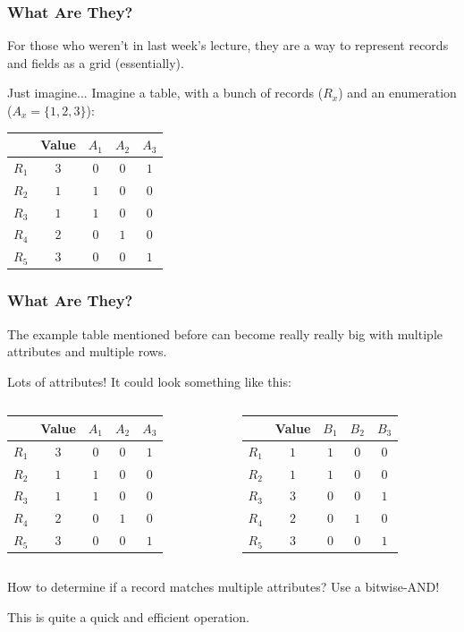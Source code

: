 \documentclass[11pt]{beamer}
\begin{document}
\begin{frame}
	\frametitle{What Are They?}
	
	For those who weren't in last week's lecture, they are a way to represent records and fields as a grid (essentially).
	
	\begin{exampleblock}{Just imagine...}
		Imagine a table, with a bunch of records ($R_x$) and an enumeration ($A_x = \{1, 2, 3\}$):
		
		\begin{tabular}{r|c|c|c|c}
				& \textbf{Value} & $A_1$ & $A_2$ & $A_3$ \\ \hline
			$R_1$ & $3$	& $0$	& $0$	& $1$ \\
			$R_2$ & $1$	& $1$	& $0$	& $0$ \\
			$R_3$ & $1$	& $1$	& $0$	& $0$ \\
			$R_4$ & $2$	& $0$	& $1$	& $0$ \\
			$R_5$ & $3$	& $0$	& $0$	& $1$ 
		\end{tabular}
	\end{exampleblock}
\end{frame}

\begin{frame}
	\frametitle{What Are They?}
	
	The example table mentioned before can become really really big with multiple attributes and multiple rows.
	\pause
	\begin{exampleblock}{Lots of attributes!}
		It could look something like this:
		
		\begin{columns}[c]
			\begin{tabular}{r|c|c|c|c}
					& \textbf{Value} & $A_1$ & $A_2$ & $A_3$ \\ \hline
				$R_1$ & $3$	& $0$	& $0$	& $1$ \\
				$R_2$ & $1$	& $1$	& $0$	& $0$ \\
				$R_3$ & $1$	& $1$	& $0$	& $0$ \\
				$R_4$ & $2$	& $0$	& $1$	& $0$ \\
				$R_5$ & $3$	& $0$	& $0$	& $1$ 
			\end{tabular}
			\begin{tabular}{r|c|c|c|c}
					& \textbf{Value} & $B_1$ & $B_2$ & $B_3$ \\ \hline
				$R_1$ & $1$	& $1$	& $0$	& $0$ \\
				$R_2$ & $1$	& $1$	& $0$	& $0$ \\
				$R_3$ & $3$	& $0$	& $0$	& $1$ \\
				$R_4$ & $2$	& $0$	& $1$	& $0$ \\
				$R_5$ & $3$	& $0$	& $0$	& $1$ 
			\end{tabular}
		\end{columns}	
	\end{exampleblock}
	
	\pause
	How to determine if a record matches multiple attributes? Use a bitwise-AND!
	
	\pause
	This is quite a quick and efficient operation.
\end{frame}
\end{document}
